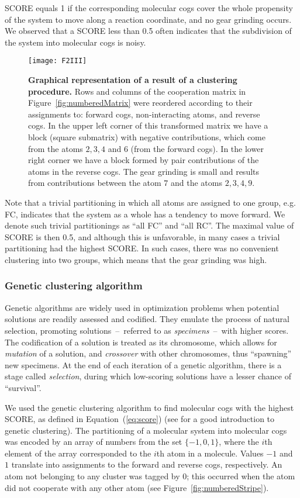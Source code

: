 SCORE equals 1 if the corresponding molecular cogs cover the whole propensity of the system to move along a reaction coordinate, and no gear grinding occurs.
We observed that a SCORE less than 0.5 often indicates that the subdivision of the system into molecular cogs is noisy.

\begin{figure}[H]
\centering
\texttt{[image: F2III]}
\caption{
{\bf Graphical representation of a result of a clustering procedure.}
Rows and columns of the cooperation matrix in Figure~\ref{fig:numberedMatrix} were reordered according to their assignments to: forward cogs, non-interacting atoms, and reverse cogs.	
In the upper left corner of this transformed matrix we have a block (square submatrix) with negative contributions, which come from the atoms $2, 3, 4$ and $6$ (from the forward cogs).
In the lower right corner we have a block formed by pair contributions of the atoms in the reverse cogs.
The gear grinding is small and results from contributions between the atom $7$ and the atoms ${2, 3, 4, 9}$.
}
\label{fig:numberedMatrixClustered}
\end{figure}

Note that a trivial partitioning in which all atoms are assigned to one group, e.g. FC, indicates that the system as a whole has a tendency to move forward.
We denote such trivial partitionings as ``all FC'' and ``all RC''.
The maximal value of SCORE is then 0.5, and although this is unfavorable, in many cases a trivial partitioning had the highest SCORE.
In such cases, there was no convenient clustering into two groups, which means that the gear grinding was high.

\subsubsection*{Genetic clustering algorithm}\label{sec:genetic}
Genetic algorithms are widely used in optimization problems when potential solutions are readily assessed and codified.
They emulate the process of natural selection, promoting solutions~--~referred to as \emph{specimens}~--~with higher scores.
The codification of a solution is treated as its chromosome, which allows for \emph{mutation} of a solution, and \emph{crossover} with other chromosomes, thus ``spawning'' new specimens.
At the end of each iteration of a genetic algorithm, there is a stage called \emph{selection}, during which low-scoring solutions have a lesser chance of ``survival''.

We used the genetic clustering algorithm to find molecular cogs with the highest SCORE, as defined in Equation~(\ref{eq:score}) (see \cite{cole1998clustering} for a good introduction to genetic clustering).
The partitioning of a molecular system into molecular cogs was encoded by an array of numbers from the set \mbox{$\{-1,0,1\}$}, where the $i$th element of the array corresponded to the $i$th atom in a molecule.
Values $-1$ and $1$ translate into assignments to the forward and reverse cogs, respectively.
An atom not belonging to any cluster was tagged by 0; this occurred when the atom did not cooperate with any other atom {\color{black}(see Figure~\ref{fig:numberedStripe})}.

